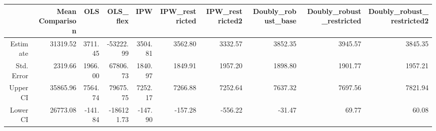 \documentclass{article}
\begin{document}
\begin{landscape}

\begin{table}[ht]
\centering
\begin{tabular}{rrrrrrrrrr}
  \hline
 & Mean Comparison & OLS & OLS\_flex & IPW & IPW\_restricted & IPW\_restricted2 & Doubly\_robust\_base & Doubly\_robust\_restricted & Doubly\_robust\_restricted2 \\ 
  \hline
Estimate & 31319.52 & 3711.45 & -53222.99 & 3504.81 & 3562.80 & 3332.57 & 3852.35 & 3945.57 & 3845.35 \\ 
  Std. Error & 2319.66 & 1966.00 & 67806.73 & 1840.97 & 1849.91 & 1957.20 & 1898.80 & 1901.77 & 1957.21 \\ 
  Upper CI & 35865.96 & 7564.74 & 79675.75 & 7252.17 & 7266.88 & 7252.64 & 7637.32 & 7697.56 & 7821.94 \\ 
  Lower CI & 26773.08 & -141.84 & -186121.73 & -147.90 & -157.28 & -556.22 & -31.47 & 69.77 & 60.08 \\ 
   \hline
\end{tabular}
\end{table}
\end{landscape}
\end{document}
